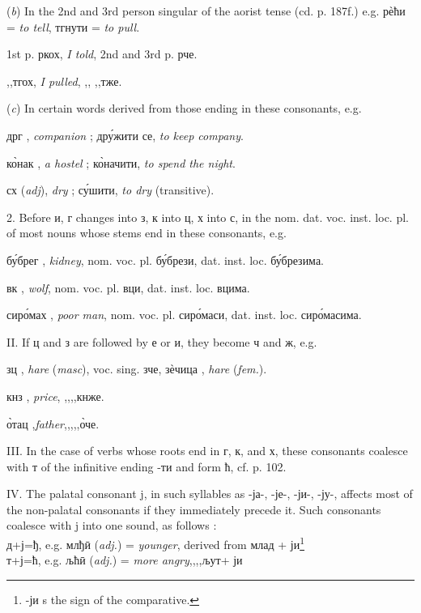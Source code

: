 ({\it b}) In the 2nd and 3rd person singular of the aorist tense (cd. p. 187f.) e.g. р\`{е}ћи = \emph{to tell}, тгнути = \emph{to pull}.

1st p. ркох, \emph{I told}, \quad 2nd and 3rd p. рче. 

\quad,,\quad тгох, \emph{I pulled}, \quad,, \quad \qquad,,\qquad тже.

({\it c}) In certain words derived from those ending in these consonants, e.g.

дрг \masc, \emph{companion} ; др\'{у}жити се, \emph{to keep company}.

к\`{о}нак \masc, \emph{a hostel} ; к\`{о}начити, \emph{to spend the night}.

сх ({\it adj}), \emph{dry} ; с\'{у}шити, \emph{to dry} (transitive). 

2. Before и, г changes into з, к into ц, х into с, in the nom. dat. voc. inst.
loc. pl. of most nouns whose stems end in these consonants, e.g.

б\'{у}брег \masc, \emph{kidney}, nom. voc. pl. б\'{у}брези, dat. inst. loc. б\'{у}брезима. 

вк \masc, \emph{wolf}, nom. voc. pl. вци, dat. inst. loc. вцима.  

сир\'{о}мах \masc, \emph{poor man}, nom. voc. pl. сир\'{о}маси, dat. inst. loc. сир\'{о}масима.

II. If ц and з are followed by е or и, they become ч and ж, e.g.

зц \masc, \emph{hare} ({\it masc}), voc. sing. зче, з\`{е}чица \femn, \emph{hare} ({\it fem.}).

кнз \masc, \emph{price}, \qquad,,\quad,,\quad кнже.

\`{о}тац \masc,\emph{father},\qquad,,\quad,,\quad \`{о}че.

III. In the case of verbs whose roots end in г, к, and х, these consonants
coalesce with т of the infinitive ending -ти and form ћ, cf. p. 102.


IV. The palatal consonant j, in such syllables as -ја-, -је-, -ји-, -ју-,
affects most of the non-palatal consonants if they immediately precede it. Such
consonants coalesce with j into one sound, as follows :\\ 
д+ј=ђ, e.g. млђ\={и} ({\it adj.}) = \emph{younger}, derived from млад +
ји\footnote{-ји s the sign of the comparative.}\\ 
т+ј=ћ, e.g. љћ\={и} ({\it adj.}) = \emph{more angry}\quad,,\qquad,,\quad љут\quad\hspace*{-2pt}+ ји

